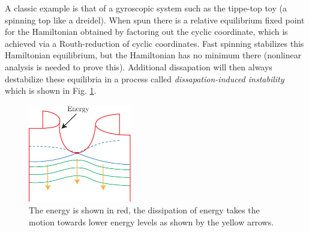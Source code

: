 \begin{ex}
	A classic example is that of a gyroscopic system such as the tippe-top toy (a spinning top like a dreidel). When spun there is a relative equilibrium fixed point for the Hamiltonian obtained by factoring out the cyclic coordinate, which is achieved via a Routh-reduction of cyclic coordinates. Fast spinning stabilizes this Hamiltonian equilibrium, but the Hamiltonian has no minimum there (nonlinear analysis is needed to prove this). Additional dissapation will then always destabilize these equilibria in a process called \emph{dissapation-induced instability} which is shown in Fig. \ref{fig:dissapation_instability}.
	\begin{figure}[h!]
		\centering
		\includegraphics[width=0.4\textwidth]{figures/ch8/19dissapation_instability.pdf}
		\caption{The energy is shown in red, the dissipation of energy takes the motion towards lower energy levels as shown by the yellow arrows.}
		\label{fig:dissapation_instability}
	\end{figure}
\end{ex}

